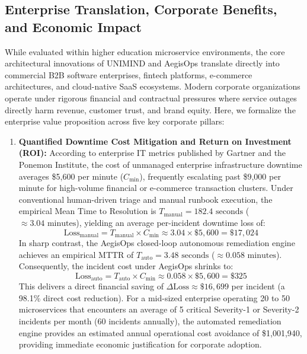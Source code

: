 \documentclass[12pt,onecolumn,draftclsnofoot]{IEEEtran}
\begin{document}
\subsection{Enterprise Translation, Corporate Benefits, and Economic Impact}
While evaluated within higher education microservice environments, the core architectural innovations of UNIMIND and AegisOps translate directly into commercial B2B software enterprises, fintech platforms, e-commerce architectures, and cloud-native SaaS ecosystems. Modern corporate organizations operate under rigorous financial and contractual pressures where service outages directly harm revenue, customer trust, and brand equity. Here, we formalize the enterprise value proposition across five key corporate pillars:

\begin{enumerate}
    \item \textbf{Quantified Downtime Cost Mitigation and Return on Investment (ROI):}
    According to enterprise IT metrics published by Gartner and the Ponemon Institute, the cost of unmanaged enterprise infrastructure downtime averages \$5,600 per minute ($C_{\text{min}}$), frequently escalating past \$9,000 per minute for high-volume financial or e-commerce transaction clusters. Under conventional human-driven triage and manual runbook execution, the empirical Mean Time to Resolution is $T_{\text{manual}} = 182.4\text{ seconds}$ ($\approx 3.04\text{ minutes}$), yielding an average per-incident downtime loss of:
    \begin{equation}
        \text{Loss}_{\text{manual}} = T_{\text{manual}} \times C_{\text{min}} \approx 3.04 \times \$5,600 = \$17,024
    \end{equation}
    In sharp contrast, the AegisOps closed-loop autonomous remediation engine achieves an empirical MTTR of $T_{\text{auto}} = 3.48\text{ seconds}$ ($\approx 0.058\text{ minutes}$). Consequently, the incident cost under AegisOps shrinks to:
    \begin{equation}
        \text{Loss}_{\text{auto}} = T_{\text{auto}} \times C_{\text{min}} \approx 0.058 \times \$5,600 = \$325
    \end{equation}
    This delivers a direct financial saving of $\Delta \text{Loss} \approx \$16,699$ per incident (a 98.1\% direct cost reduction). For a mid-sized enterprise operating 20 to 50 microservices that encounters an average of 5 critical Severity-1 or Severity-2 incidents per month (60 incidents annually), the automated remediation engine provides an estimated annual operational cost avoidance of \$1,001,940, providing immediate economic justification for corporate adoption.


\end{enumerate}
\end{document}

